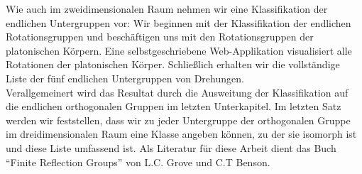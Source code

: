 Wie auch im zweidimensionalen Raum nehmen wir eine Klassifikation der endlichen Untergruppen vor: Wir beginnen mit der Klassifikation der endlichen Rotationsgruppen und beschäftigen uns mit den Rotationsgruppen der platonischen Körpern. Eine selbstgeschriebene Web-Applikation visualisiert alle Rotationen der platonischen Körper. Schließlich erhalten wir die vollständige Liste der fünf endlichen Untergruppen von Drehungen.\\
Verallgemeinert wird das Resultat durch die Ausweitung der Klassifikation auf die endlichen orthogonalen Gruppen im letzten Unterkapitel. Im letzten Satz werden wir feststellen, dass wir zu jeder Untergruppe der orthogonalen Gruppe im dreidimensionalen Raum eine Klasse angeben können, zu der sie isomorph ist und diese Liste umfassend ist.
Als Literatur für diese Arbeit dient das Buch \enquote{Finite Reflection Groups} von L.C. Grove und C.T Benson. 
